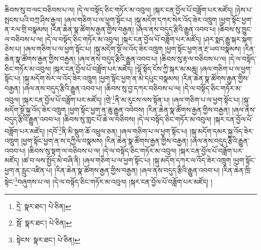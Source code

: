 ཆིབས་སུ་བ་ལང་བཅིབས་པ་ལ། །དེ་ལ་བསྟོད་ཅིང་གཏོར་མ་འབུལ། །སྐར་ངན་བྱོལ་པོ་བཟློག་པར་མཛོད། །ཉེས་པ་སྤངས་པའི་བཀྲ་ཤིས་རྒྱལ། །ཞལ་གཅིག་པ་ལ་ཕྱག་སྟོང་པ། །སྐུ་མདོག་དཀར་སེར་འོད་ཟེར་འཁྲུག །ཕྱག་སྟོང་ཕྱག་ན་རལ་གྲི་བསྣམས། །རིན་ཆེན་སྣ་ཚོགས་རྒྱན་གྱིས་བརྒྱན། །ཞལ་ནས་བདུད་རྩིའི་རྒྱུན་འབབ་པ། །ཆིབས་སུ་ཁྱུང་ལ་བཅིབས་པ་ལ། །དེ་ལ་བསྟོད་ཅིང་གཏོར་མ་འབུལ། །སྐར་ངན་བྱོལ་པོ་བཟློག་པར་མཛོད། །ཤར་སྨད་རྒྱུ་སྐར་སྐག་ཅེས་པ། །ཞལ་གཅིག་པ་ལ་ཕྱག་སྟོང་པ། །སྐུ་མདོག་སྔོ་ལ་འོད་ཟེར་འཁྲུག །ཕྱག་སྟོང་ཕྱག་ན་རྔ་ཡབ་བསྣམས། །རིན་ཆེན་སྣ་ཚོགས་རྒྱན་གྱིས་བརྒྱན། །ཞལ་ནས་བདུད་རྩིའི་རྒྱུན་འབབ་པ། །ཆིབས་སུ་རྟ་ལ་བཅིབས་པ་ལ། །དེ་ལ་བསྟོད་ཅིང་གཏོར་མ་འབུལ། །སྐར་ངན་བྱོལ་པོ་བཟློག་པར་མཛོད། །ལྷོ་སྟོད་ངོས་ཀྱི་སྐར་མ་མཆུ། །ཞལ་གཅིག་པ་ལ་ཕྱག་སྟོང་པ། །སྐུ་མདོག་སེར་ལ་འོད་ཟེར་འཁྲུག །ཕྱག་སྟོང་ཕྱག་ན་མེ་དཔུང་བསྣམས། །རིན་ཆེན་སྣ་ཚོགས་རྒྱན་གྱིས་བརྒྱན། །ཞལ་ནས་བདུད་རྩིའི་རྒྱུན་འབབ་པ། །ཆིབས་སུ་བྱ་དཀར་བཅིབས་པ་ལ། །དེ་ལ་བསྟོད་ཅིང་གཏོར་མ་འབུལ། །སྐར་ངན་བྱོལ་པོ་བཟློག་པར་མཛོད། །གྲེ་\footnote{དྲེ་  སྣར་ཐང་།  པེ་ཅིན། }ནི་མ་རུངས་ལས་སྟོན་པ། །ཞལ་གཅིག་པ་ལ་ཕྱག་སྟོང་པ། །སྐུ་མདོག་སྔོ་སྐྱ་འོད་ཟེར་འཁྲུག །ཕྱག་སྟོང་ཕྱག་ན་ཆུ་རྒྱུན་འབེབས། །རིན་ཆེན་སྣ་ཚོགས་རྒྱན་གྱིས་བརྒྱན། །ཞལ་ནས་བདུད་རྩིའི་རྒྱུན་འབབ་པ། །ཆིབས་སུ་གླང་པོ་ཆེ་ལ་བཅིབས། །དེ་ལ་བསྟོད་ཅིང་གཏོར་མ་འབུལ། །སྐར་ངན་བྱོལ་པོ་བཟློག་པར་མཛོད། །དབོ་\footnote{སྦོ་  སྣར་ཐང་།  པེ་ཅིན། }ནི་མི་སྡུག་ཆོ་འཕྲུལ་ཅན། །ཞལ་གཅིག་པ་ལ་ཕྱག་སྟོང་པ། །སྐུ་མདོག་དམར་སྐྱ་འོད་ཟེར་འཁྲུག །ཕྱག་སྟོང་ཕྱག་ན་ས་དཀྱིལ་བསྣམས། །རིན་ཆེན་སྣ་ཚོགས་རྒྱན་གྱིས་བརྒྱན། །ཞལ་ནས་བདུད་རྩིའི་རྒྱུན་འབབ་པ། །ཆིབས་སུ་སྟག་ལ་བཅིབས་པ་ལ། །དེ་ལ་བསྟོད་ཅིང་གཏོར་མ་འབུལ། །སྐར་ངན་བྱོལ་པོ་བཟློག་པར་མཛོད། །ཚ་བ་ལས་སྤྱོད་མེ་བཞི་ནི། །ཞལ་གཅིག་པ་ལ་ཕྱག་སྟོང་པ། །སྐུ་མདོག་དཀར་ལ་འོད་ཟེར་འཁྲུག །ཕྱག་སྟོང་ཕྱག་ན་རླུང་འཛིན་པ། །རིན་ཆེན་སྣ་ཚོགས་རྒྱན་གྱིས་བརྒྱན། །ཞལ་ནས་བདུད་རྩིའི་རྒྱུན་འབབ་པ། །རིན་ཆེན་ཁྲི་སྟེང་\footnote{སྟེངས་  སྣར་ཐང་།  པེ་ཅིན། }བཞུགས་པ་ལ། །དེ་ལ་བསྟོད་ཅིང་གཏོར་མ་འབུལ། །སྐར་ངན་བྱོལ་པོ་བཟློག་པར་མཛོད། །
